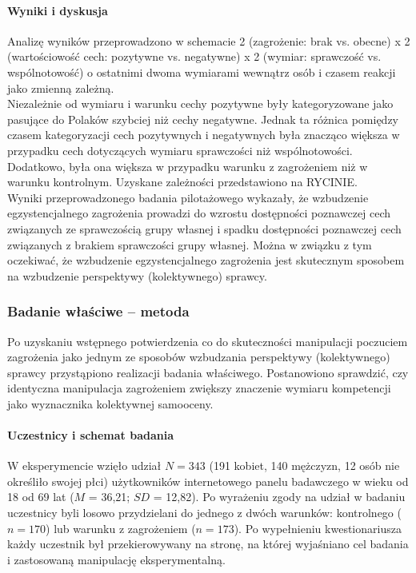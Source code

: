 \documentclass[man]{apa6}
\begin{document}
\paragraph{Wyniki i dyskusja}
Analizę wyników przeprowadzono w schemacie 2 (zagrożenie: brak vs. obecne) x 2 (wartościowość cech: pozytywne vs. negatywne) x 2 (wymiar: sprawczość vs. wspólnotowość) o ostatnimi dwoma wymiarami wewnątrz osób i czasem reakcji jako zmienną zależną.\\

Niezależnie od wymiaru i warunku cechy pozytywne były kategoryzowane jako pasujące do Polaków szybciej niż cechy negatywne. Jednak ta różnica pomiędzy czasem kategoryzacji cech pozytywnych i negatywnych była znacząco większa w przypadku cech dotyczących wymiaru sprawczości niż wspólnotowości. Dodatkowo, była ona większa w przypadku warunku z zagrożeniem niż w warunku kontrolnym. Uzyskane zależności przedstawiono na RYCINIE.\\

Wyniki przeprowadzonego badania pilotażowego wykazały, że wzbudzenie egzystencjalnego zagrożenia prowadzi do wzrostu dostępności poznawczej cech związanych ze sprawczością grupy własnej i spadku dostępności poznawczej cech związanych z brakiem sprawczości grupy własnej. Można w związku z tym oczekiwać, że wzbudzenie egzystencjalnego zagrożenia jest skutecznym sposobem na wzbudzenie perspektywy (kolektywnego) sprawcy.

\subsubsection{Badanie właściwe -- metoda}

Po uzyskaniu wstępnego potwierdzenia co do skuteczności manipulacji poczuciem zagrożenia jako jednym ze sposobów wzbudzania perspektywy (kolektywnego) sprawcy przystąpiono realizacji badania właściwego. Postanowiono sprawdzić, czy identyczna manipulacja zagrożeniem zwiększy znaczenie wymiaru kompetencji jako wyznacznika kolektywnej samooceny.

\paragraph{Uczestnicy i schemat badania}
W eksperymencie wzięło udział $N=343$ (191 kobiet, 140 mężczyzn, 12 osób nie określiło swojej płci) użytkowników internetowego panelu badawczego w wieku od 18 od 69 lat ($M$ = 36,21; $SD$ = 12,82). Po wyrażeniu zgody na udział w badaniu uczestnicy byli losowo przydzielani do jednego z dwóch warunków: kontrolnego ($n = 170$) lub warunku z zagrożeniem ($n = 173$). Po wypełnieniu kwestionariusza każdy uczestnik był przekierowywany na stronę, na której wyjaśniano cel badania i zastosowaną manipulację eksperymentalną.
\end{document}
